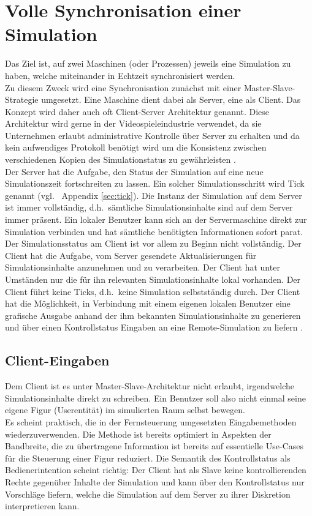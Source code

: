 \section{Volle Synchronisation einer Simulation}
Das Ziel ist, auf zwei Maschinen (oder Prozessen) jeweils eine Simulation zu haben, welche miteinander in Echtzeit synchronisiert werden.\\
Zu diesem Zweck wird eine Synchronisation zunächst mit einer Master-Slave-Strategie umgesetzt. Eine Maschine dient dabei als Server, eine als Client. Das Konzept wird daher auch oft Client-Server Architektur genannt.
Diese Architektur wird gerne in der Videospieleindustrie verwendet, da sie Unternehmen erlaubt administrative Kontrolle über Server zu erhalten und da kein aufwendiges  Protokoll benötigt wird um die Konsistenz zwischen verschiedenen Kopien des Simulationstatus zu gewährleisten \cite{Cronin01adistributed}.\\
Der Server hat die Aufgabe, den Status der Simulation auf eine neue Simulationszeit fortschreiten zu lassen. Ein solcher Simulationsschritt wird Tick genannt (vgl.~ Appendix \ref{sec:tick}). Die Instanz der Simulation auf dem Server ist immer vollständig, d.h.~sämtliche Simulationsinhalte sind auf dem Server immer präsent. Ein lokaler Benutzer kann sich an der Servermaschine direkt zur Simulation verbinden und hat sämtliche benötigten Informationen sofort parat.\\
Der Simulationsstatus am Client ist vor allem zu Beginn nicht vollständig. Der Client hat die Aufgabe, vom Server gesendete Aktualisierungen für Simulationsinhalte anzunehmen und zu verarbeiten. Der Client hat unter Umständen nur die für ihn relevanten Simulationsinhalte lokal vorhanden. Der Client führt keine Ticks, d.h.~keine Simulation selbstständig durch. Der Client hat die Möglichkeit, in Verbindung mit einem eigenen lokalen Benutzer eine grafische Ausgabe anhand der ihm bekannten Simulationsinhalte zu generieren und über einen Kontrollstatus Eingaben an eine Remote-Simulation zu liefern \cite[ch. 6.1]{gamenetworking00}.

\subsection{Client-Eingaben}
Dem Client ist es unter Master-Slave-Architektur nicht erlaubt, irgendwelche Simulationsinhalte direkt zu schreiben. Ein Benutzer soll also nicht einmal seine eigene Figur (Userentität) im simulierten Raum selbst bewegen.\\
Es scheint praktisch, die in der Fernsteuerung umgesetzten Eingabemethoden wiederzuverwenden. Die Methode ist bereits optimiert in Aspekten der Bandbreite, die zu übertragene Information ist bereits auf essentielle Use-Cases für die Steuerung einer Figur reduziert. Die Semantik des Kontrollstatus als Bedienerintention scheint richtig: Der Client hat als Slave keine kontrollierenden Rechte gegenüber Inhalte der Simulation und kann über den Kontrollstatus nur Vorschläge liefern, welche die Simulation auf dem Server zu ihrer Diskretion interpretieren kann.

